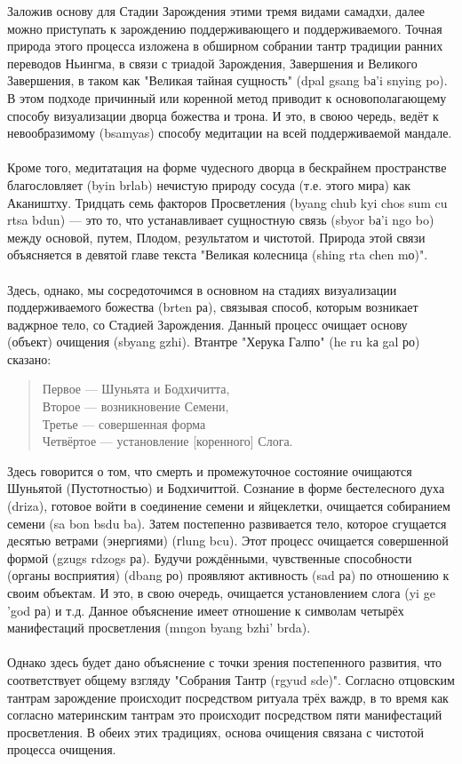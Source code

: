 Заложив основу для Стадии Зарождения этими тремя видами самадхи, далее можно
приступать к зарождению поддерживающего и поддерживаемого. Точная природа этого
процесса изложена в обширном собрании тантр традиции ранних переводов Ньингма, в связи
с триадой Зарождения, Завершения и Великого Завершения, в таком как "Великая тайная
сущность" (dpal gsang bа'i snying po). В этом подходе причинный или коренной метод
приводит к основополагающему способу визуализации дворца божества и трона. И это, в
своюо чередь, ведёт к невообразимому (bsamyas) способу медитации на всей
поддерживаемой мандале.\\
\\
Кроме того, медитатация на форме чудесного дворца в бескрайнем пространстве
благословляет (byin brlab) нечистую природу сосуда (т.е. этого мира) как Акаништху.
Тридцать семь факторов Просветления (byang chub kyi chos sum cu rtsa bdun) — это то, что
устанавливает сущностную связь (sbyor bа'i ngo bo) между основой, путем, Плодом,
результатом и чистотой. Природа этой связи объясняется в девятой главе текста
"Великая колесница (shing rta chen mо)".\\
\\
Здесь, однако, мы сосредоточимся в основном на стадиях визуализации поддерживаемого
божества (brten ра), связывая способ, которым возникает ваджрное тело, со Стадией
Зарождения. Данный процесс очищает основу (объект) очищения (sbyang gzhi).
Втантре "Херука Галпо" (he ru kа gal ро) сказано:

\begin{verse}
Первое — Шуньята и Бодхичитта,\\
Второе — возникновение Семени,\\
Третье — совершенная форма\\
Четвёртое — установление [коренного] Слога.
\end{verse}

Здесь говорится о том, что смерть и промежуточное состояние очищаются Шуньятой
(Пустотностью) и Бодхичиттой. Сознание в форме бестелесного духа (driza), готовое войти
в соединение семени и яйцеклетки, очищается собиранием семени (sa bon bsdu ba). Затем
постепенно развивается тело, которое сгущается десятью ветрами (энергиями) (гlung bcu).
Этот процесс очищается совершенной формой (gzugs rdzogs ра). Будучи рождёнными,
чувственные способности (органы восприятия) (dbang ро) проявляют активность (sad ра) по
отношению к своим объектам. И это, в свою очередь, очищается установлением слога (yi ge
'god ра) и т.д. Данное объяснение имеет отношение к символам четырёх манифестаций
просветления (mngon byang bzhi' brda).\\
\\
Однако здесь будет дано объяснение с точки зрения постепенного развития, что
соответствует общему взгляду "Собрания Тантр (rgyud sde)". Согласно отцовским тантрам
зарождение происходит посредством ритуала трёх важдр, в то время как согласно
материнским тантрам это происходит посредством пяти манифестаций просветления. В
обеих этих традициях, основа очищения связана с чистотой процесса очищения.\\


